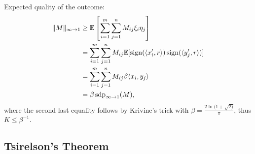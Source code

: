 	\begin{frame}
		\begin{pbmr}
			Expected quality of the outcome:
			\begin{align*}
				 \Vert {M} \Vert_{\infty\to 1} &\geq \mathbb{E}\left[\sum_{i=1}^m\sum_{j=1}^n M_{ij}\xi_i\eta_j\right]\\
				&= \sum_{i=1}^m\sum_{j=1}^n M_{ij} \mathbb{E}[\operatorname{sign}(\langle{x_i^\prime},{r}\rangle) \operatorname{sign}(\langle{y_j^\prime},{r}\rangle)] \\
				&=\sum_{i=1}^m\sum_{j=1}^n M_{ij}\beta \langle{x_i},{y_j}\rangle \\
				&=\beta \operatorname{sdp}_{\infty\to 1}(M),
			\end{align*}
			where the second last equality follows by Krivine's trick with $\beta = \frac{2\ln(1+\sqrt{2)}}{\pi}$, thus $K\leq \beta^{-1}$.
		\end{pbmr}
	\end{frame}

\subsection{Tsirelson's Theorem}
\frame{\tableofcontents[currentsubsection]}

